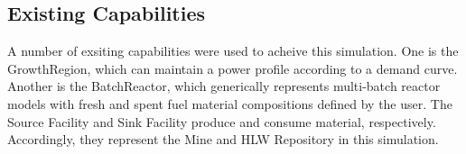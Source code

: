 \subsection{Existing Capabilities}

A number of exsiting capabilities were used to acheive this simulation. One is 
the GrowthRegion, which can maintain a power profile according to a demand 
curve. Another is the BatchReactor, which generically represents multi-batch reactor 
models with fresh and spent fuel material compositions defined by the user. The 
Source Facility and Sink Facility produce and consume material, respectively. 
Accordingly, they represent the Mine and HLW Repository in this simulation.  

